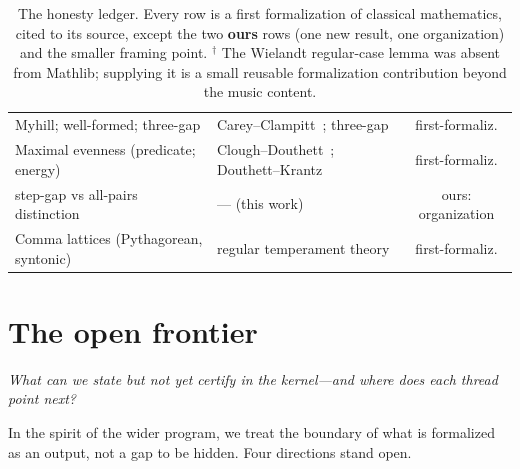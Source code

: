 \documentclass[11pt]{article}
\newcommand{\question}[1]{\smallskip\noindent\textit{#1}\smallskip}
\begin{document}
\begin{table}[H]
\begin{tabular}{@{}p{} p{} c@{}}
Myhill; well-formed; three-gap & Carey--Clampitt~\cite{CareyClampitt}; three-gap & first-formaliz.\\
Maximal evenness (predicate; energy) & Clough--Douthett~\cite{CloughDouthett}; Douthett--Krantz~\cite{DouthettKrantz} & first-formaliz.\\
\quad step-gap vs all-pairs distinction & --- (this work) & ours: organization\\
Comma lattices (Pythagorean, syntonic) & regular temperament theory & first-formaliz.\\
\bottomrule
\end{tabular}
\caption{The honesty ledger. Every row is a first formalization of classical mathematics, cited
to its source, except the two \textbf{ours} rows (one new result, one organization) and the
smaller framing point. $^\dagger$ The Wielandt regular-case lemma was absent from Mathlib;
supplying it is a small reusable formalization contribution beyond the music content.}
\label{tab:ledger}
\end{table}

\section{The open frontier}\label{sec:frontier}

\question{What can we state but not yet certify in the kernel---and where does each thread point
next?}

In the spirit of the wider program, we treat the boundary of what is formalized as an output,
not a gap to be hidden. Four directions stand open.
\end{document}

